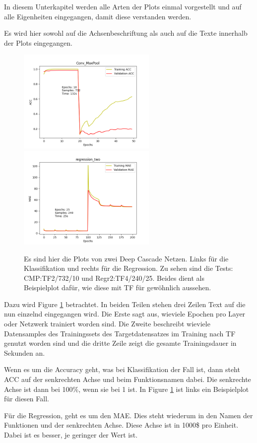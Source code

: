 In diesem Unterkapitel werden alle Arten der Plots einmal vorgestellt und auf alle Eigenheiten eingegangen, damit diese verstanden werden. 

Es wird hier sowohl auf die Achsenbeschriftung als auch auf die Texte innerhalb der Plots eingegangen. 

\begin{figure}[htpb]
    \includegraphics[height=5cm]{../../Plots/ba_plots/convmaxpool/2TFtr.png}
    \includegraphics[height=5cm]{../../Plots/ba_plots/regr2/regr2train.png}
    \caption{\label{fig:ploterkl} 
    \small{Es sind hier die Plots von zwei Deep Cascade Netzen. Links für die Klassifikation und rechts für die Regression. 
    Zu sehen sind die Tests: CMP:TF2/732/10 und Regr2:TF4/240/25. Beides dient als Beispielplot dafür, wie diese mit TF für 
    gewöhnlich aussehen. }}
\end{figure}

Dazu wird Figure \ref{fig:ploterkl} betrachtet. In beiden Teilen stehen drei Zeilen Text auf die nun einzelnd eingegangen wird. Die Erste sagt aus, 
wieviele Epochen pro Layer oder Netzwerk trainiert worden sind. Die Zweite beschreibt wieviele Datensamples des Trainingssets des 
Targetdatensatzes im Training nach TF genutzt worden sind und die dritte Zeile zeigt die gesamte Trainingsdauer in Sekunden an. 

Wenn es um die Accuracy geht, was bei Klassifikation der Fall ist, dann steht ACC auf der senkrechten Achse und beim Funktionsnamen dabei. 
Die senkrechte Achse ist dann bei 100\%, wenn sie bei 1 ist. In Figure \ref{fig:ploterkl} ist links ein Beispielplot für diesen Fall. 

Für die Regression, geht es um den MAE. Dies steht wiederum in den Namen der Funktionen und der senkrechten Achse. Diese Achse ist in 1000\$ pro 
Einheit. Dabei ist es besser, je geringer der Wert ist. 
